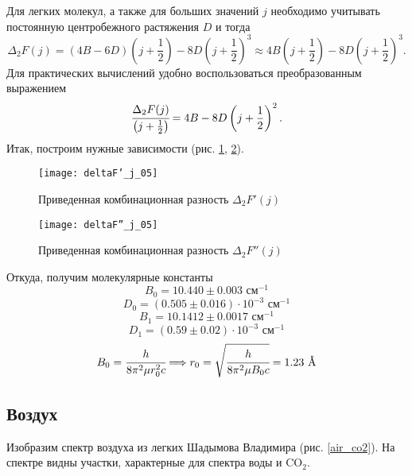 Для легких молекул, а также для больших значений $j$ необходимо учитывать постоянную центробежного растяжения $D$ и тогда
\begin{equation}
\Delta_2F(j)=(4B-6D)\left(j+\frac{1}{2}\right)-8D\left(j+\frac{1}{2}\right)^3\approx4B\left(j+\frac{1}{2}\right)-8D\left(j+\frac{1}{2}\right)^3.
\end{equation}
Для практических вычислений удобно воспользоваться преобразованным выражением 
\begin{equation}
\cfrac{\Delta_2F(j)}{\left(j+\frac{1}{2}\right)}=4B-8D\left(j+\frac{1}{2}\right)^2.
\end{equation}
Итак, построим нужные зависимости (рис. \ref{deltaF'_j}, \ref{deltaF''_j}).
\begin{figure}[h!]
	\centering
	\texttt{[image: deltaF'\_j\_05]}
	\caption{Приведенная комбинационная разность $\Delta_2F'(j)$}
	\label{deltaF'_j}
\end{figure}
\begin{figure}[h!]
	\centering
	\texttt{[image: deltaF''\_j\_05]}
	\caption{Приведенная комбинационная разность $\Delta_2F''(j)$}
	\label{deltaF''_j}
\end{figure}

\noindent Откуда, получим молекулярные константы
\begin{equation}
B_0 = 10.440\pm0.003 \text{ см$^{-1}$}
\end{equation}
\begin{equation}
D_0 = (0.505\pm0.016)\cdot10^{-3}\text{ см$^{-1}$}
\end{equation}
\begin{equation}
B_1 = 10.1412\pm0.0017\text{ см$^{-1}$}
\end{equation}
\begin{equation}
D_1 = (0.59\pm0.02)\cdot10^{-3}\text{ см$^{-1}$}
\end{equation}
\begin{equation}
B_0 = \cfrac{h}{8\pi^2\mu r_0^2c} \Longrightarrow r_0 = \sqrt{\cfrac{h}{8\pi^2\mu B_0 c}} = 1.23 \text{ \AA}
\end{equation}

\subsection{Воздух}
Изобразим спектр воздуха из легких Шадымова Владимира (рис. \ref{air_co2}). На спектре видны участки, характерные для спектра воды и CO$_2$.
